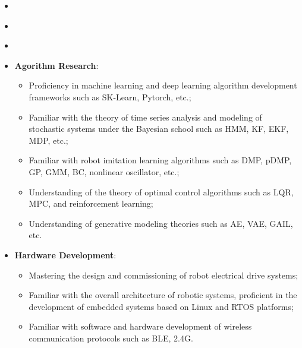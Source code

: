 \begin{itemize}[leftmargin=*]
  \item {}
\end{itemize}

\vspace{-1mm}
\begin{itemize}[leftmargin=*]
  \item {}
\end{itemize}

\vspace{-1mm}
\begin{itemize}[leftmargin=*]
  \item {}
\end{itemize}

\vspace{-1mm}
\begin{itemize}[leftmargin=*]
  \item \textbf{Agorithm Research}: 
  {\small
  \begin{itemize}
    \item Proficiency in machine learning and deep learning algorithm development frameworks such as SK-Learn, Pytorch, etc.;
    \item Familiar with the theory of time series analysis and modeling of stochastic systems under the Bayesian school such as HMM, KF, EKF, MDP, etc.;
    \item Familiar with robot imitation learning algorithms such as DMP, pDMP, GP, GMM, BC, nonlinear oscillator, etc.;
    \item Understanding of the theory of optimal control algorithms such as LQR, MPC, and reinforcement learning;
    \item Understanding of generative modeling theories such as AE, VAE, GAIL, etc.
  \end{itemize}}
\end{itemize}

\vspace{-3mm}
\begin{itemize}[leftmargin=*]
  \item \textbf{Hardware Development}: 
  {\small
  \begin{itemize}
    \item Mastering the design and commissioning of robot electrical drive systems;
    \item Familiar with the overall architecture of robotic systems, proficient in the development of embedded systems based on Linux and RTOS platforms;
    \item Familiar with software and hardware development of wireless communication protocols such as BLE, 2.4G.
  \end{itemize}}
\end{itemize}

